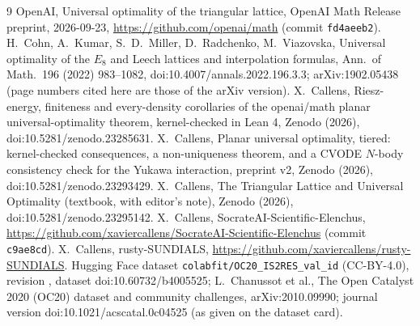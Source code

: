 \documentclass[11pt]{article}
\theoremstyle{remark}
\begin{document}
\begin{thebibliography}{9}
 OpenAI, Universal optimality of the triangular lattice, OpenAI Math Release preprint, 2026-09-23,
\url{https://github.com/openai/math} (commit \texttt{fd4aeeb2}).
 H.~Cohn, A.~Kumar, S.~D.~Miller, D.~Radchenko, M.~Viazovska, Universal optimality of the $E_8$ and
Leech lattices and interpolation formulas, Ann.\ of Math.\ 196 (2022) 983--1082, doi:10.4007/annals.2022.196.3.3;
arXiv:1902.05438 (page numbers cited here are those of the arXiv version).
 X.~Callens, Riesz-energy, finiteness and every-density corollaries of the openai/math planar
universal-optimality theorem, kernel-checked in Lean 4, Zenodo (2026), doi:10.5281/zenodo.23285631.
 X.~Callens, Planar universal optimality, tiered: kernel-checked consequences, a non-uniqueness theorem,
and a CVODE $N$-body consistency check for the Yukawa interaction, preprint v2, Zenodo (2026), doi:10.5281/zenodo.23293429.
 X.~Callens, The Triangular Lattice and Universal Optimality (textbook, with editor's note), Zenodo
(2026), doi:10.5281/zenodo.23295142.
 X.~Callens, SocrateAI-Scientific-Elenchus,
\url{https://github.com/xaviercallens/SocrateAI-Scientific-Elenchus} (commit \texttt{c9ae8cd}).
 X.~Callens, rusty-SUNDIALS, \url{https://github.com/xaviercallens/rusty-SUNDIALS}.
 Hugging Face dataset \texttt{colabfit/OC20\_IS2RES\_val\_id} (CC-BY-4.0), revision
\texttt{\OcRev}, dataset doi:10.60732/b4005525; L.~Chanussot et al., The Open Catalyst 2020 (OC20) dataset and
community challenges, arXiv:2010.09990; journal version doi:10.1021/acscatal.0c04525 (as given on the dataset card).
\end{thebibliography}
\end{document}
